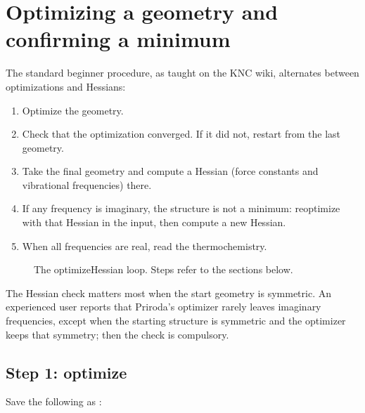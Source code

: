 \documentclass[letterpaper,10pt,english,openany,oneside]{sphinxmanual}
\begin{document}
\section{Optimizing a geometry and confirming a minimum}
\label{\detokenize{start/getting-started:optimizing-a-geometry-and-confirming-a-minimum}}
\sphinxAtStartPar
The standard beginner procedure, as taught on the KNC wiki, alternates between optimizations and Hessians:


\begin{enumerate}
%
\item {} 
\sphinxAtStartPar
Optimize the geometry.

\item {} 
\sphinxAtStartPar
Check that the optimization converged. If it did not, restart from the last geometry.

\item {} 
\sphinxAtStartPar
Take the final geometry and compute a Hessian (force constants and vibrational frequencies) there.

\item {} 
\sphinxAtStartPar
If any frequency is imaginary, the structure is not a minimum: re\sphinxhyphen{}optimize with that Hessian in the input, then
compute a new Hessian.

\item {} 
\sphinxAtStartPar
When all frequencies are real, read the thermochemistry.

\end{enumerate}

\begin{figure}[htbp]
\centering
\capstart

\caption{The optimize\textendash{}Hessian loop. Steps refer to the sections below.}\label{\detokenize{start/getting-started:id1}}\end{figure}

\sphinxAtStartPar
The Hessian check matters most when the start geometry is symmetric. An experienced user reports that Priroda’s
optimizer rarely leaves imaginary frequencies, except when the starting structure is symmetric and the optimizer keeps
that symmetry; then the check is compulsory. 


\subsection{Step 1: optimize}
\label{\detokenize{start/getting-started:step-1-optimize}}
\sphinxAtStartPar
Save the following as :
\end{document}
